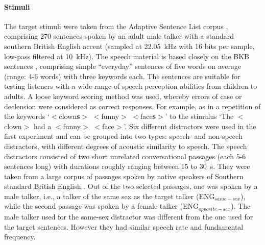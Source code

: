 \documentclass[a4paper, twoside]{templates/ociamthesis}
\begin{document}
\hypertarget{stimuli}{%
\paragraph{Stimuli}\label{stimuli}}

The target stimuli were taken from the Adaptive Sentence List corpus \autocite[ASL;][]{MacLeod1990}, comprising 270 sentences spoken by an adult male talker with a standard southern British English accent (sampled at 22.05~kHz with 16 bits per sample, low-pass filtered at 10~kHz). The speech material is based closely on the BKB sentences \autocite{Bench1979}, comprising simple ``everyday'' sentences of five words on average (range: 4-6 words) with three keywords each. The sentences are suitable for testing listeners with a wide range of speech perception abilities from children to adults. A loose keyword scoring method was used, whereby errors of case or declension were considered as correct responses. For example, as in a repetition of the keywords `\(<\)clown\textbf{s}\(>\) \(<\)funny\(>\) \(<\)face\textbf{s}\(>\)' to the stimulus `The \(<\)clown\(>\) had a \(<\)funny\(>\) \(<\)face\(>\)'. Six different distractors were used in the first experiment and can be grouped into two types: speech- and non-speech distractors, with different degrees of acoustic similarity to speech. The speech distractors consisted of two short unrelated conversational passages (each 5-6 sentences long) with durations roughly ranging between 15 to 30~s. They were taken from a large corpus of passages spoken by native speakers of Southern standard British English \autocite[EUROM corpus;][]{Chan1995}. Out of the two selected passages, one was spoken by a male talker, i.e., a talker of the same sex as the target talker (ENG\(_{same-sex}\)), while the second passage was spoken by a female talker (ENG\(_{opposite-sex}\)). The male talker used for the same-sex distractor was different from the one used for the target sentences. However they had similar speech rate and fundamental frequency.\\
\end{document}
